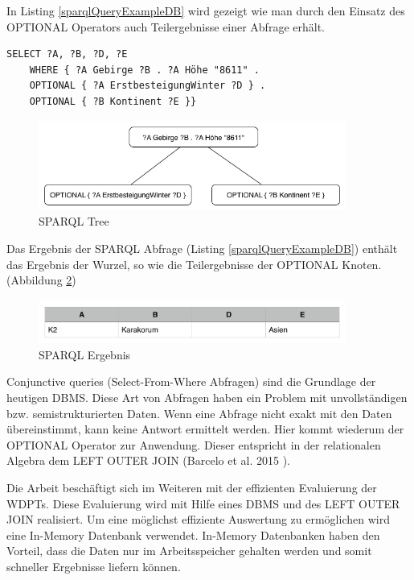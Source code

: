 \documentclass[draft,final]{vutinfth} %
\begin{document}
In Listing \ref{sparqlQueryExampleDB} wird gezeigt wie man durch den Einsatz des OPTIONAL Operators auch Teilergebnisse einer Abfrage erhält.

\begin{lstlisting}[float,language=Sparql,caption={SPARQL DB Beispiel},frame = single,label={sparqlQueryExampleDB}]
SELECT ?A, ?B, ?D, ?E
	WHERE { ?A Gebirge ?B . ?A Höhe "8611" . 
	OPTIONAL { ?A ErstbesteigungWinter ?D } .
	OPTIONAL { ?B Kontinent ?E }}
\end{lstlisting}

\begin{figure}[ht]
	\centering
	\includegraphics[width=0.9\textwidth]{SPARQL}
	\caption{SPARQL Tree}
	\label{sparqlTree}
\end{figure}

Das Ergebnis der SPARQL Abfrage (Listing \ref{sparqlQueryExampleDB}) enthält das Ergebnis der Wurzel, so wie die Teilergebnisse der OPTIONAL Knoten. (Abbildung \ref{sparqlErgebnis})

\begin{figure}[ht]
	\centering
	\includegraphics[width=0.9\textwidth]{sparqlErgebnis}
	\caption{SPARQL Ergebnis}
	\label{sparqlErgebnis}
\end{figure}

Conjunctive queries (Select-From-Where Abfragen) sind die Grundlage der heutigen DBMS. Diese Art von Abfragen haben ein Problem mit unvollständigen bzw. semistrukturierten Daten. Wenn eine Abfrage nicht exakt mit den Daten übereinstimmt, kann keine Antwort ermittelt werden. Hier kommt wiederum der OPTIONAL Operator zur Anwendung. Dieser entspricht in der relationalen Algebra dem LEFT OUTER JOIN (Barcelo et al. 2015 \cite{DBLP:conf/pods/BarceloPS15}). 

Die Arbeit beschäftigt sich im Weiteren mit der effizienten Evaluierung der WDPTs. Diese Evaluierung wird mit Hilfe eines DBMS und des LEFT OUTER JOIN realisiert. Um eine möglichst effiziente Auswertung zu ermöglichen wird eine In-Memory Datenbank verwendet. In-Memory Datenbanken haben den Vorteil, dass die Daten nur im Arbeitsspeicher gehalten werden und somit schneller Ergebnisse liefern können. 
\end{document}
